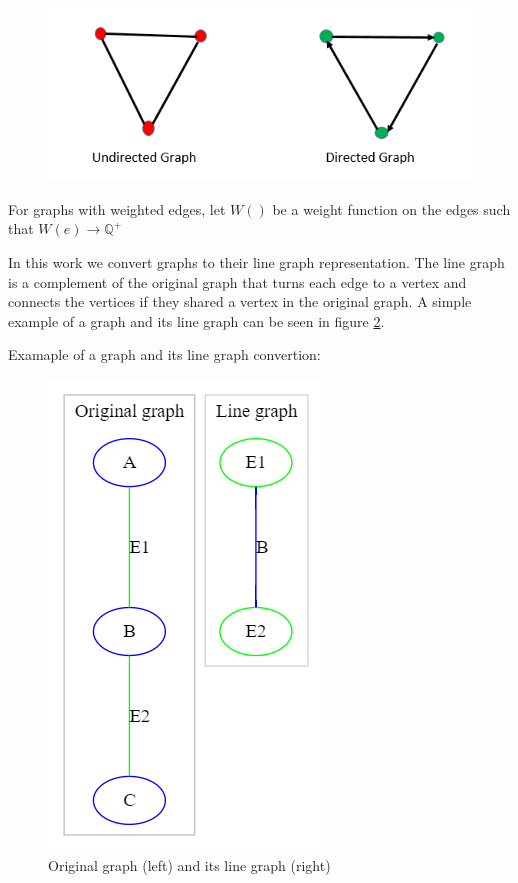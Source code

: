 \begin{figure}[H]
    \centering
    \includegraphics[scale=0.7]{figures/graph-theory}
    \label{The difference between a directed and an undirected graph}
\end{figure}

For graphs with weighted edges, let $W()$ be a weight function on the edges such that $W(e) \rightarrow \mathbb{Q}^+$ 

In this work we convert graphs to their line graph representation. The line graph is a complement of the original graph that turns each edge to a vertex and connects the vertices if they shared a vertex in the original graph. A simple example of a graph and its line graph can be seen in figure \ref{Line graph figure}.

Examaple of a graph and its line graph convertion:
\begin{figure}[H]
    \centering
    \includegraphics[scale=0.5]{figures/LineGraphExample}
    \caption{Original graph (left) and its line graph (right)}
    \label{Line graph figure}
\end{figure}

